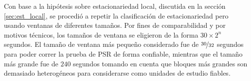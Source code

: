 
Con base a la hipótesis sobre estacionariedad local, discutida en la sección \ref{sec:est_local}, se procedió a repetir la clasificación de estacionariedad pero usando ventanas de diferentes tamaños.
%
Por fines de comparabilidad y por motivos técnicos, los tamaños de ventana se eligieron de la forma $30 \times 2^{n}$ segundos.
%
El tamaño de ventana más pequeño considerado fue de $\nicefrac{30}{32}$ segundos para poder correr la prueba de PSR de forma confiable, mientras que el tamaño más grande fue de $240$ segundos tomando en cuenta que bloques más grandes son demasiado heterogéneos para considerarse como unidades de estudio fiables.


